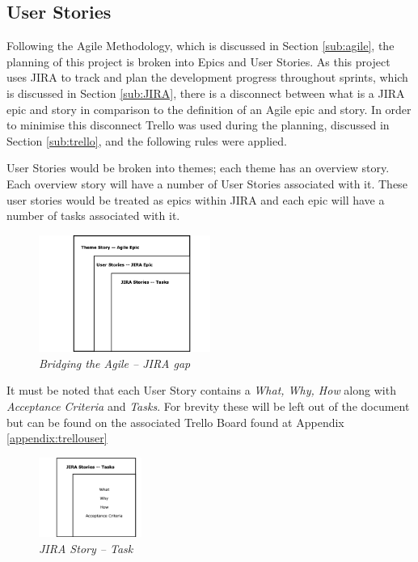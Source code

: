 \subsection{User Stories}
\label{sub:user_stories}
Following the Agile Methodology, which is discussed in Section \ref{sub:agile}, the planning of this project is broken into Epics and User Stories. As this project uses JIRA to track and plan the development progress throughout sprints, which is discussed in Section \ref{sub:JIRA}, there is a disconnect between what is a JIRA epic and story in comparison to the definition of an Agile epic and story. In order to minimise this disconnect Trello was used during the planning, discussed in Section \ref{sub:trello}, and the following rules were applied.

User Stories would be broken into themes; each theme has an overview story. Each overview story will have a number of User Stories associated with it. These user stories would be treated as epics within JIRA and each epic will have a number of tasks associated with it. 

\begin{figure}[!ht]
\centering
\includegraphics*[width=0.5\textwidth]{images/stories.png}
\caption{\em Bridging the Agile -- JIRA gap}
\label{img:bridging-agile}
\end{figure}

It must be noted that each User Story contains a \textit{What, Why, How} along with \textit{Acceptance Criteria} and \textit{Tasks}. For brevity these will be left out of the document but can be found on the associated Trello Board found at Appendix \ref{appendix:trellouser}

\begin{figure}[!ht]
\centering
\includegraphics*[width=0.3\textwidth]{images/stories1.png}
\caption{\em JIRA Story -- Task}
\label{img:jira-story}
\end{figure}

